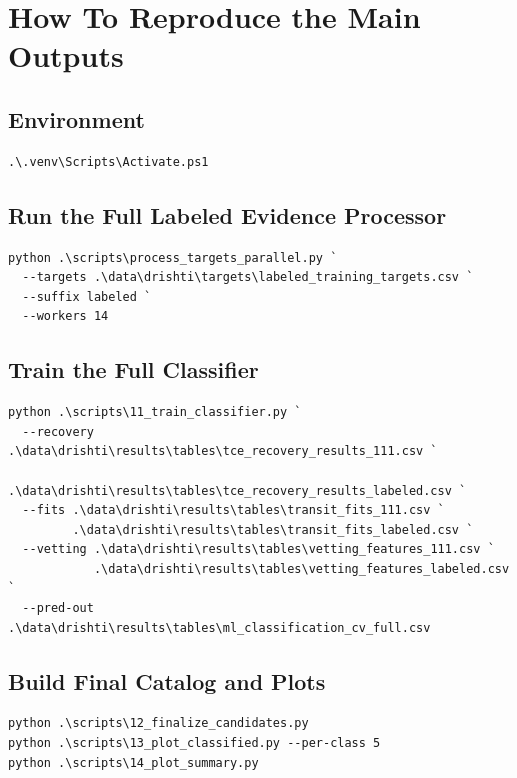 \documentclass[11pt,a4paper]{article}
\begin{document}
\section{How To Reproduce the Main Outputs}

\subsection{Environment}

\begin{verbatim}
.\.venv\Scripts\Activate.ps1
\end{verbatim}

\subsection{Run the Full Labeled Evidence Processor}

\begin{verbatim}
python .\scripts\process_targets_parallel.py `
  --targets .\data\drishti\targets\labeled_training_targets.csv `
  --suffix labeled `
  --workers 14
\end{verbatim}

\subsection{Train the Full Classifier}

\begin{verbatim}
python .\scripts\11_train_classifier.py `
  --recovery .\data\drishti\results\tables\tce_recovery_results_111.csv `
             .\data\drishti\results\tables\tce_recovery_results_labeled.csv `
  --fits .\data\drishti\results\tables\transit_fits_111.csv `
         .\data\drishti\results\tables\transit_fits_labeled.csv `
  --vetting .\data\drishti\results\tables\vetting_features_111.csv `
            .\data\drishti\results\tables\vetting_features_labeled.csv `
  --pred-out .\data\drishti\results\tables\ml_classification_cv_full.csv
\end{verbatim}

\subsection{Build Final Catalog and Plots}

\begin{verbatim}
python .\scripts\12_finalize_candidates.py
python .\scripts\13_plot_classified.py --per-class 5
python .\scripts\14_plot_summary.py
\end{verbatim}
\end{document}
